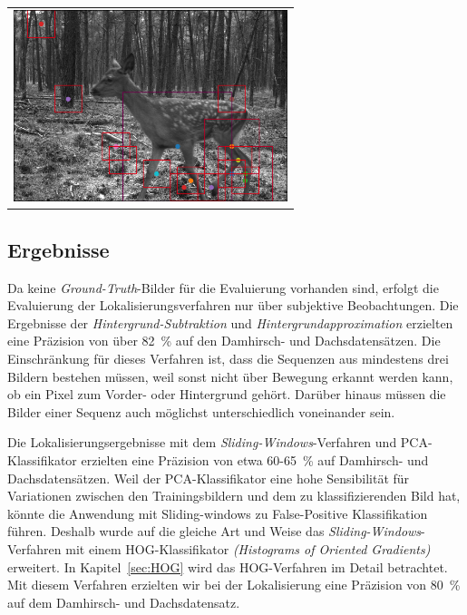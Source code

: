 \begin{center}
\begin{tabular}{c}
\includegraphics[width=8cm]{img/Segmentierung/localisation}
\end{tabular}
\label{fig:loc}
\end{center}

\subsection{Ergebnisse}
Da keine \textit{Ground-Truth}-Bilder für die Evaluierung vorhanden sind, erfolgt die Evaluierung der Lokalisierungsverfahren nur über subjektive Beobachtungen. Die Ergebnisse der \textit{Hintergrund-Subtraktion} und \textit{Hintergrundapproximation} erzielten eine Präzision von über 82~\% auf den Damhirsch- und Dachsdatensätzen.
Die Einschränkung für dieses Verfahren ist, dass die Sequenzen aus mindestens drei Bildern bestehen müssen, weil sonst nicht über Bewegung erkannt werden kann, ob ein Pixel zum Vorder- oder Hintergrund gehört. Darüber hinaus müssen die Bilder einer Sequenz auch möglichst unterschiedlich voneinander sein.
 
Die Lokalisierungsergebnisse mit dem \textit{Sliding-Windows}-Verfahren und PCA-Klassifikator erzielten eine Präzision von etwa 60-65~\% auf Damhirsch- und Dachsdatensätzen. Weil der PCA-Klassifikator eine hohe Sensibilität für Variationen zwischen den Trainingsbildern und dem zu klassifizierenden Bild hat, könnte die Anwendung mit Sliding-windows zu False-Positive Klassifikation führen. Deshalb wurde auf die gleiche Art und Weise das \textit{Sliding-Windows}-Verfahren mit einem HOG-Klassifikator \textit{(Histograms of Oriented Gradients)} erweitert. In Kapitel~\ref{sec:HOG} wird das HOG-Verfahren im Detail betrachtet. Mit diesem Verfahren erzielten wir bei der Lokalisierung eine Präzision von 80~\% auf dem Damhirsch- und Dachsdatensatz.